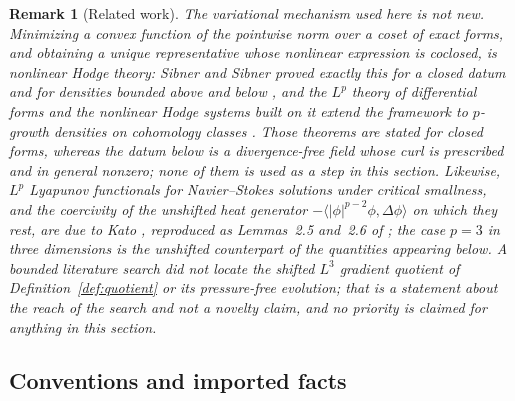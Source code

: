 \documentclass[11pt]{article}
\newtheorem{remark}[theorem]{Remark}
\theoremstyle{definition}
\theoremstyle{plain}
\begin{document}
\begin{remark}[Related work]\label{rem:quotient-related}
The variational mechanism used here is not new.  Minimizing a convex
function of the pointwise norm over a coset of exact forms, and obtaining a
unique representative whose \emph{nonlinear} expression is coclosed, is
nonlinear Hodge theory: Sibner and Sibner proved exactly this for a closed
datum and for densities bounded above and below
\cite[\S3.2 and \S4]{SibnerSibner1970}, and the $L^p$ theory of
differential forms and the nonlinear Hodge systems built on it extend the
framework to $p$-growth densities on cohomology classes
\cite{Scott1995,IwaniecScottStroffolini1999}.  Those theorems are stated
for closed forms, whereas the datum below is a divergence-free field whose
curl is prescribed and in general nonzero; none of them is used as a step
in this section.  Likewise, $L^p$ Lyapunov functionals for Navier--Stokes
solutions under critical smallness, and the coercivity of the unshifted
heat generator $-\langle|\phi|^{p-2}\phi,\Delta\phi\rangle$ on which they
rest, are due to Kato \cite{Kato1990}, reproduced as Lemmas~2.5 and~2.6 of
\cite{MannaSritharan2007}; the case $p=3$ in three dimensions is the
unshifted counterpart of the quantities appearing below.  A bounded
literature search did not locate the shifted $L^3$ gradient quotient of
Definition~\ref{def:quotient} or its pressure-free evolution; that is a
statement about the reach of the search and not a novelty claim, and no
priority is claimed for anything in this section.
\end{remark}

\subsection{Conventions and imported facts}
\label{subsec:quotient-conventions}
\end{document}
